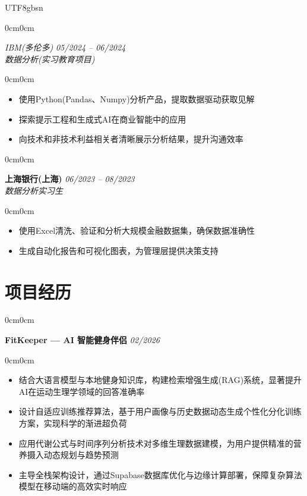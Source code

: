 \documentclass[10pt, letterpaper]{article}
\newenvironment{highlights}{
    \begin{itemize}[topsep=0.1cm,itemsep=0.1cm,leftmargin=12pt]
}{
    \end{itemize}
}
\newenvironment{onecolentry}{
    \begin{adjustwidth}{0cm}{0cm}
}{
    \end{adjustwidth}
}
\begin{document}
\begin{CJK*}{UTF8}{gbsn}
\begin{onecolentry}
\textit{IBM(多伦多)} \hfill \textit{05/2024 -- 06/2024}\\
\textit{数据分析(实习教育项目)}
\end{onecolentry}

\begin{onecolentry}
\begin{highlights}
\item 使用Python(Pandas、Numpy)分析产品，提取数据驱动获取见解
\item 探索提示工程和生成式AI在商业智能中的应用
\item 向技术和非技术利益相关者清晰展示分析结果，提升沟通效率
\end{highlights}
\end{onecolentry}

\vspace{0.2cm}

\begin{onecolentry}
\textbf{上海银行(上海)} \hfill \textit{06/2023 -- 08/2023}\\
\textit{数据分析实习生}
\end{onecolentry}

\begin{onecolentry}
\begin{highlights}
\item 使用Excel清洗、验证和分析大规模金融数据集，确保数据准确性
\item 生成自动化报告和可视化图表，为管理层提供决策支持
\end{highlights}
\end{onecolentry}

\section{项目经历}

\begin{onecolentry}
\textbf{FitKeeper — AI 智能健身伴侣} \hfill \textit{02/2026}
\end{onecolentry}

\begin{onecolentry}
\begin{highlights}
\item 结合大语言模型与本地健身知识库，构建检索增强生成(RAG)系统，显著提升AI在运动生理学领域的回答准确率
\item 设计自适应训练推荐算法，基于用户画像与历史数据动态生成个性化分化训练方案，实现科学的渐进超负荷
\item 应用代谢公式与时间序列分析技术对多维生理数据建模，为用户提供精准的营养摄入动态规划与趋势预测
\item 主导全栈架构设计，通过Supabase数据库优化与边缘计算部署，保障复杂算法模型在移动端的高效实时响应
\end{highlights}
\end{onecolentry}


\end{CJK*}
\end{document}
